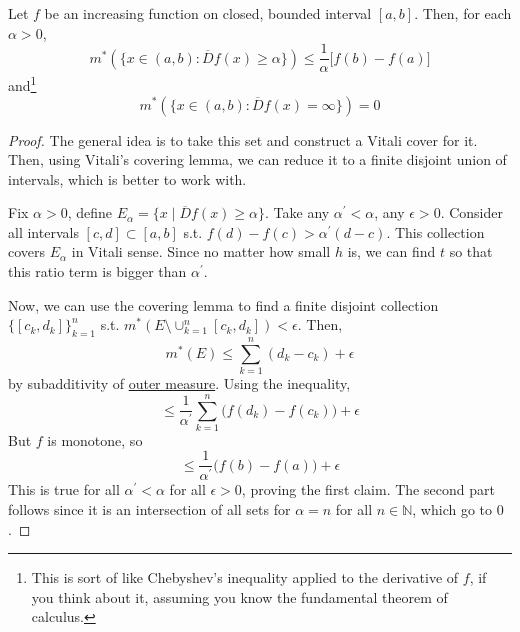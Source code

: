   \begin{lemma}
    \label{thm:mvt-inequality-generalization}
 
    Let $f$ be an increasing function on closed, bounded interval $[a, b]$. Then, for each $\alpha > 0$, 
    \begin{equation}
      m^\ast (\{x \in (a, b) \colon \overline{D} f(x) \geq \alpha\}) \leq \frac{1}{\alpha} \big[ f(b) - f(a) \big]
    \end{equation}
    and\footnote{This is sort of like Chebyshev's inequality applied to the derivative of $f$, if you think about it, assuming you know the fundamental theorem of calculus.} 
    \begin{equation}
      m^\ast (\{x \in (a, b) \colon \overline{D} f(x) = \infty\}) = 0 
    \end{equation}
  \end{lemma}
  \begin{proof}
    The general idea is to take this set and construct a Vitali cover for it. Then, using Vitali's covering lemma, we can reduce it to a finite disjoint union of intervals, which is better to work with. 

    Fix $\alpha > 0$, define $E_\alpha = \{ x \mid \overline{D} f(x) \geq \alpha\}$. Take any $\alpha^\prime < \alpha$, any $\epsilon > 0$. Consider all intervals $[c, d] \subset [a, b]$ s.t. $f(d) - f(c) > \alpha^\prime (d - c)$. This collection covers $E_\alpha$ in Vitali sense. Since no matter how small $h$ is, we can find $t$ so that this ratio term is bigger than $\alpha^\prime$. 

    Now, we can use the covering lemma to find a finite disjoint collection $\{[c_k, d_k]\}_{k=1}^n$ s.t. $m^\ast ( E \setminus \cup_{k=1}^n [c_k, d_k]) < \epsilon$. Then, 
    \begin{equation}
      m^\ast (E) \leq \sum_{k=1}^n (d_k - c_k) + \epsilon 
    \end{equation}
    by subadditivity of \hyperref[def:outer-measure]{outer measure}. Using the inequality, 
    \begin{equation}
      \leq \frac{1}{\alpha^\prime} \sum_{k=1}^n \big( f(d_k) - f(c_k) \big) + \epsilon
    \end{equation}
    But $f$ is monotone, so 
    \begin{equation}
      \leq \frac{1}{\alpha^\prime} \big( f(b) - f(a) \big) + \epsilon
    \end{equation}
    This is true for all $\alpha^\prime < \alpha$ for all $\epsilon > 0$, proving the first claim. The second part follows since it is an intersection of all sets for $\alpha = n$ for all $n \in \mathbb{N}$, which go to $0$. 
  \end{proof}

